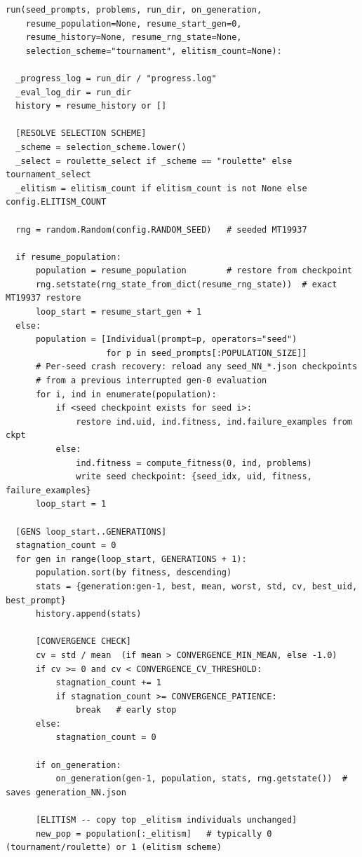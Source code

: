 \documentclass[11pt,a4paper]{report}
\begin{document}
\begin{lstlisting}[style=chain]
run(seed_prompts, problems, run_dir, on_generation,
    resume_population=None, resume_start_gen=0,
    resume_history=None, resume_rng_state=None,
    selection_scheme="tournament", elitism_count=None):

  _progress_log = run_dir / "progress.log"
  _eval_log_dir = run_dir
  history = resume_history or []

  [RESOLVE SELECTION SCHEME]
  _scheme = selection_scheme.lower()
  _select = roulette_select if _scheme == "roulette" else tournament_select
  _elitism = elitism_count if elitism_count is not None else config.ELITISM_COUNT

  rng = random.Random(config.RANDOM_SEED)   # seeded MT19937

  if resume_population:
      population = resume_population        # restore from checkpoint
      rng.setstate(rng_state_from_dict(resume_rng_state))  # exact MT19937 restore
      loop_start = resume_start_gen + 1
  else:
      population = [Individual(prompt=p, operators="seed")
                    for p in seed_prompts[:POPULATION_SIZE]]
      # Per-seed crash recovery: reload any seed_NN_*.json checkpoints
      # from a previous interrupted gen-0 evaluation
      for i, ind in enumerate(population):
          if <seed checkpoint exists for seed i>:
              restore ind.uid, ind.fitness, ind.failure_examples from ckpt
          else:
              ind.fitness = compute_fitness(0, ind, problems)
              write seed checkpoint: {seed_idx, uid, fitness, failure_examples}
      loop_start = 1

  [GENS loop_start..GENERATIONS]
  stagnation_count = 0
  for gen in range(loop_start, GENERATIONS + 1):
      population.sort(by fitness, descending)
      stats = {generation:gen-1, best, mean, worst, std, cv, best_uid, best_prompt}
      history.append(stats)

      [CONVERGENCE CHECK]
      cv = std / mean  (if mean > CONVERGENCE_MIN_MEAN, else -1.0)
      if cv >= 0 and cv < CONVERGENCE_CV_THRESHOLD:
          stagnation_count += 1
          if stagnation_count >= CONVERGENCE_PATIENCE:
              break   # early stop
      else:
          stagnation_count = 0

      if on_generation:
          on_generation(gen-1, population, stats, rng.getstate())  # saves generation_NN.json

      [ELITISM -- copy top _elitism individuals unchanged]
      new_pop = population[:_elitism]   # typically 0 (tournament/roulette) or 1 (elitism scheme)


\end{lstlisting}
\end{document}

